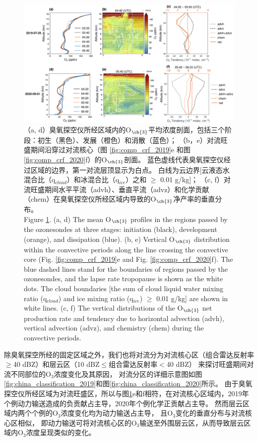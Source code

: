\begin{figure}[H]
\centering
\includegraphics[width=\textwidth]{./figures/tendency_o3.png}
\caption{
（a, d）臭氧探空仪所经区域内的O$_{\ch{3}}$平均浓度剖面，包括三个阶段：初生（黑色）、发展（橙色）和消散（蓝色）；
（b，e）对流旺盛期间沿穿过对流核心（图 \ref{fig:comp_crf_2019}e 和图 \ref{fig:comp_crf_2020}f）的O$_{\ch{3}}$剖面。
蓝色虚线代表臭氧探空仪经过区域的边界，第一对流层顶显示为白点。
白线为云边界[云液态水混合比（q$_{cloud}$）和冰混合比（q$_{ice}$）之和 $\geq$ 0.01 g/kg]；
（c, f）对流旺盛期间水平平流（advh）、垂直平流（advz）和化学贡献（chem）在臭氧探空仪所经区域内导致的O$_{\ch{3}}$净产率的垂直分布。
\\
Figure \ref{fig:tendency_o3}. (a, d) The mean O$_{\ch{3}}$ profiles in the regions passed by the ozonesondes
at three stages: initiation (black), development (orange), and dissipation (blue).
(b, e) Vertical O$_{\ch{3}}$ distribution within the convective periods along the line crossing the convective core (Fig. \ref{fig:comp_crf_2019}e and Fig. \ref{fig:comp_crf_2020}f).
The blue dashed lines stand for the boundaries of regions passed by the ozonesondes, and the lapse rate tropopause is shown as the white dots.
The cloud boundaries [the sum of cloud liquid water mixing ratio (q$_{cloud}$) and ice mixing ratio (q$_{ice}$) $\geq$ 0.01 g/kg] are shown in white lines.
(c, f) The vertical distributions of the O$_{\ch{3}}$ net production rate and tendency due to horizontal advection (advh), vertical advection (advz), and chemistry (chem) during the convective periods.
}
\label{fig:tendency_o3}
\end{figure}


除臭氧探空所经的固定区域之外，我们也将对流分为对流核心区（组合雷达反射率$\geq$40 dBZ）和层云区（10 dBZ$\leq$组合雷达反射率$<$40 dBZ）
来探讨旺盛期间对流不同部位的O$_3$浓度变化及其原因，
对流分区的详细示意图如图\ref{fig:china_classification_2019}和图\ref{fig:china_classification_2020}所示。
由于臭氧探空仪所经区域为对流旺盛区，所以与图\ref{fig:tendency_o3}e和f相符，在对流核心区域内，2019年个例动力输送造成的负贡献占主导，2020年个例化学正贡献占主导。
然而层云区域内两个个例的O$_3$浓度变化均为动力输送占主导，
且O$_3$变化的垂直分布与对流核心区相似，
即动力输送可将对流核心区的O$_3$输送至外围层云区，从而导致层云区域内O$_3$浓度呈现类似的变化。


